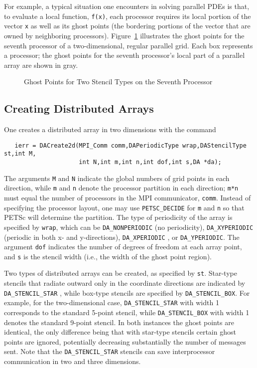 For example, a typical situation one encounters in solving parallel
PDEs is that, to evaluate a local function, {\tt f(x)}, each processor
requires its local portion of the vector {\tt x} as well as its ghost
points  (the bordering portions of the vector
that are owned by neighboring processors).  Figure~\ref{fig:ghosts}
illustrates the ghost points for the seventh processor of a
two-dimensional, regular parallel grid.  Each box represents a
processor; the ghost points for the seventh processor's local part of
a parallel array are shown in gray.

\begin{figure}[tb]
\centerline{}
\caption{Ghost Points for Two Stencil Types on the Seventh Processor}
\label{fig:ghosts}
\end{figure}

\subsection{Creating Distributed Arrays}

One creates a distributed array in two dimensions with the command 
\begin{verbatim}
   ierr = DACreate2d(MPI_Comm comm,DAPeriodicType wrap,DAStencilType st,int M,
                     int N,int m,int n,int dof,int s,DA *da);
\end{verbatim}
The   arguments
 {\tt M} and {\tt N} indicate the global
numbers of grid points in each direction, while {\tt m} and {\tt n}
denote the processor partition in each direction; {\tt m*n} must equal
the number of processors in the MPI communicator, {\tt comm}.  
Instead of specifying the processor layout, one may use
{\tt PETSC\_DECIDE} for {\tt m} and {\tt n} 
so that PETSc will determine the partition. The type of
periodicity of the array is specified by {\tt wrap}, which can be 
{\tt DA\_NONPERIODIC}  (no periodicity), 
{\tt DA\_XYPERIODIC}  (periodic in
both x- and y-directions), {\tt DA\_XPERIODIC} , 
or {\tt DA\_YPERIODIC}.  The argument {\tt dof} 
indicates the number of degrees of freedom at each array point,
and {\tt s} is the stencil width (i.e., the width of the ghost point region).

Two types of distributed arrays can be created, as specified by {\tt st}.
Star-type stencils that radiate outward only in the coordinate
directions are indicated by {\tt DA\_STENCIL\_STAR}
, while box-type stencils are specified by
{\tt DA\_STENCIL\_BOX}.  For example, for the
two-dimensional case,
{\tt DA\_STENCIL\_STAR} with width 1 corresponds to the standard 5-point
stencil, while {\tt DA\_STENCIL\_BOX} with width 1 denotes the
standard 9-point stencil.  In both instances the ghost points are
identical, the only difference being that with star-type stencils
certain ghost points are ignored, potentially decreasing substantially
the number of messages sent.  Note that the {\tt DA\_STENCIL\_STAR}
stencils can save interprocessor communication in two and three
dimensions.

